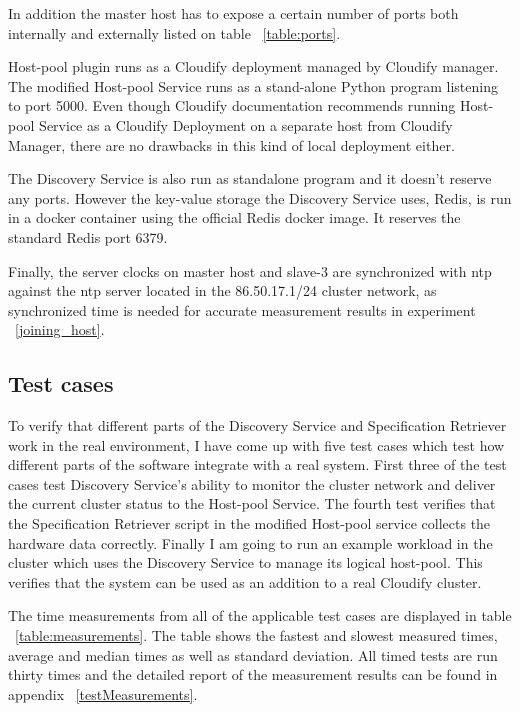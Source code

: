 In addition the master host has to expose a certain number of ports both internally and externally listed on table ~\ref{table:ports}.

Host-pool plugin runs as a Cloudify deployment managed by Cloudify manager. The modified Host-pool Service runs as a stand-alone Python program listening to port 5000. Even though Cloudify documentation recommends running Host-pool Service as a Cloudify Deployment on a separate host from Cloudify Manager, there are no drawbacks in this kind of local deployment either. 

The Discovery Service is also run as standalone program and it doesn't reserve any ports. However the key-value storage the Discovery Service uses, Redis, is run in a docker container using the official Redis docker image. It reserves the standard  Redis port 6379.

Finally, the server clocks on master host and slave-3 are synchronized with ntp against the ntp server located in the 86.50.17.1/24 cluster network, as synchronized time is needed for accurate measurement results in experiment ~\ref{joining_host}.
  

\subsection{Test cases}

To verify that different parts of the Discovery Service and Specification Retriever work in the real environment, I have come up with five test cases which test how different parts of the software integrate with a real system. First three of the test cases test Discovery Service's ability to monitor  the cluster network and deliver the current cluster status to the Host-pool Service. The fourth test verifies that the Specification Retriever script in the modified Host-pool service collects the hardware data correctly. Finally I am going to run an example workload in the cluster which uses the Discovery Service to manage its logical host-pool. This verifies that the system can be used as an addition to a real Cloudify cluster.

The time measurements from all of the applicable test cases are displayed in table ~\ref{table:measurements}. The table shows the fastest and slowest measured times, average and median times as well as standard deviation. All timed tests are run thirty times and the detailed report of the measurement results can be found in appendix ~\ref{testMeasurements}.


